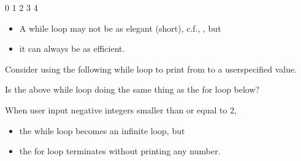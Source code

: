 \documentclass[letterpaper,10pt,english]{sphinxmanual}
\begin{document}
\begin{sphinxVerbatim}[commandchars=\\\{\}]
0
1
2
3
4
\end{sphinxVerbatim}
\begin{itemize}
\item {} 
A while loop may not be as elegant (short), c.f., , but

\item {} 
it can always be as efficient.

\end{itemize}


Consider using the following while loop to print from  to a user\sphinxhyphen{}specified value.

\begin{sphinxVerbatim}[commandchars=\\\{\}]
  
  
  
      
\end{sphinxVerbatim}

 Is the above while loop doing the same thing as the for loop below?

\begin{sphinxVerbatim}[commandchars=\\\{\}]
      
\end{sphinxVerbatim}

When user input negative integers smaller than or equal to \sphinxhyphen{}2,
\begin{itemize}
\item {} 
the while loop becomes an infinite loop, but

\item {} 
the for loop terminates without printing any number.

\end{itemize}
\end{document}

